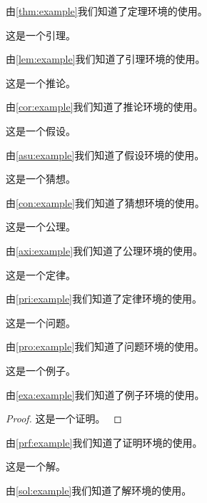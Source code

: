 \documentclass[withoutpreface,bwprint]{cumcmthesis} %
\begin{document}
由\cref{thm:example}我们知道了定理环境的使用。

\begin{lemma}
    这是一个引理。
    \label{lem:example}
\end{lemma}
由\cref{lem:example}我们知道了引理环境的使用。

\begin{corollary}
    这是一个推论。
    \label{cor:example}
\end{corollary}
由\cref{cor:example}我们知道了推论环境的使用。

\begin{assumption}
    这是一个假设。
    \label{asu:example}
\end{assumption}
由\cref{asu:example}我们知道了假设环境的使用。

\begin{conjecture}
    这是一个猜想。
    \label{con:example}
\end{conjecture}
由\cref{con:example}我们知道了猜想环境的使用。

\begin{axiom}
    这是一个公理。
    \label{axi:example}
\end{axiom}
由\cref{axi:example}我们知道了公理环境的使用。

\begin{principle}
    这是一个定律。
    \label{pri:example}
\end{principle}
由\cref{pri:example}我们知道了定律环境的使用。

\begin{problem}
    这是一个问题。
    \label{pro:example}
\end{problem}
由\cref{pro:example}我们知道了问题环境的使用。

\begin{example}
    这是一个例子。
    \label{exa:example}
\end{example}
由\cref{exa:example}我们知道了例子环境的使用。

\begin{proof}
    这是一个证明。
    \label{prf:example}
\end{proof}
由\cref{prf:example}我们知道了证明环境的使用。

\begin{solution}
    这是一个解。
    \label{sol:example}
\end{solution}
由\cref{sol:example}我们知道了解环境的使用。
\end{document}
